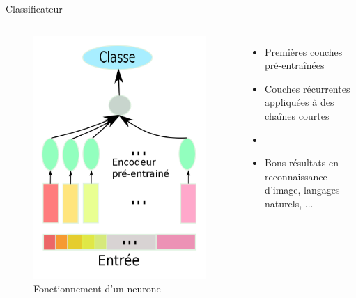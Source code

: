 \documentclass{beamer}
\begin{document}
\begin{frame}{Classificateur}

  \begin{columns}
    \begin{figure}
      \centering
      \includegraphics[scale=0.1750]{../Figures/Class}
      \caption{Fonctionnement d'un neurone}
    \end{figure}

    \begin{itemize}
    \item Premières couches pré-entraînées \pause
    \item Couches récurrentes appliquées à des chaînes courtes \pause
    \item  \pause
    \item Bons résultats en reconnaissance d'image, langages naturels, ...
    \end{itemize}
  \end{columns}

 \end{frame}
\end{document}
